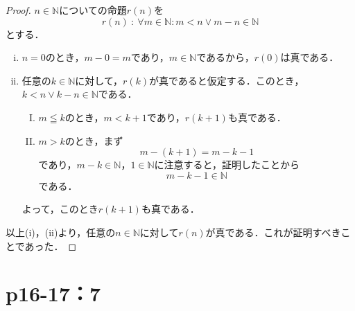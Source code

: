 \documentclass[a4paper,10pt,fleqn]{ltjsarticle}
\begin{document}
\begin{tleftbar}
    \begin{proof}
    $n \in \mathbb{N}$についての命題$r(n)$を
    \[
        r(n) ~{:}~ \forall m \in \mathbb{N} \colon  m<n \lor m-n  \in \mathbb{N}
    \]
    とする．
    \begin{enumerate}[(i)]
        \item $n=0$のとき，$m - 0 =m$であり，$m \in \mathbb{N}$であるから，$r(0)$は真である．
        \item 任意の$k \in \mathbb{N}$に対して，$r(k)$が真であると仮定する．このとき，$k<n \lor k-n  \in \mathbb{N}$である．
        \begin{enumerate}[(I)]
        \item $m \leqq   k$のとき，$m <k+1$であり，$r(k+1)$も真である．
        \item $m > k$のとき，まず
        \[
        m-(k+1)=m-k-1 
        \] であり，$m-k \in \mathbb{N}$，$1 \in \mathbb{N}$に注意すると，証明したことから
        \[
        m-k-1  \in \mathbb{N}
        \]
        である．
        \end{enumerate}
        よって，このとき$r(k+1)$も真である．
    \end{enumerate}
    以上(i)，(ii)より，任意の$n \in \mathbb{N}$に対して$r(n)$が真である．これが証明すべきことであった．
\end{proof}
\end{tleftbar}

\newpage 

\section*{p16-17：7}
\end{document}
